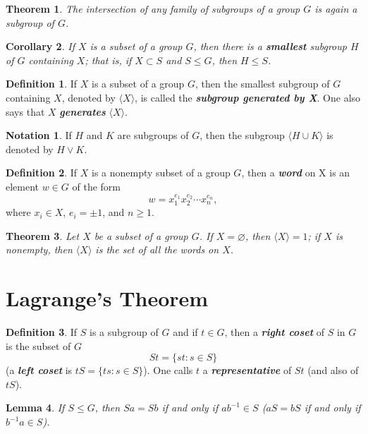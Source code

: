 \documentclass[12pt]{report}
\newtheorem{theorem}{Theorem}[chapter]
\newtheorem{corollary}[theorem]{Corollary}
\newtheorem{lemma}[theorem]{Lemma}
\theoremstyle{definition}
\newtheorem*{definition}{Definition}
\newtheorem*{notation}{Notation}
\newcommand{\term}[1]{\textbf{\textit{#1}}}
\newcommand{\gen}[1]{{\langle}#1{\rangle}}
\begin{document}
\begin{theorem}
	The intersection of any family of subgroups of a group $G$ is again a subgroup of $G$.
\end{theorem}

\begin{corollary}
	If $X$ is a subset of a group $G$, then there is a \textbf{smallest} subgroup $H$ of $G$ containing $X$; that is, if $X\subset S$ and $S\leq G$, then $H\leq S$.
\end{corollary}

\begin{definition}
	If $X$ is a subset of a group $G$, then the smallest subgroup of $G$ containing $X$, denoted by $\gen{X}$, is called the \term{subgroup generated by X}.
	One also says that $X$ \term{generates} $\gen{X}$.
\end{definition}

\begin{notation}
	If $H$ and $K$ are subgroups of $G$, then the subgroup $\gen{H\cup K}$ is denoted by $H\vee K$.
\end{notation}

\begin{definition}
	If $X$ is a nonempty subset of a group $G$, then a \term{word} on X is an element $w\in G$ of the form
	\[ w = x_1^{e_1} x_2^{e_2} \cdots x_n^{e_n}, \]
	where $x_i\in X$, $e_i=\pm1$, and $n\geq1$.
\end{definition}

\begin{theorem}
	Let $X$ be a subset of a group $G$. If $X=\varnothing$, then $\gen{X}=1$; if $X$ is nonempty, then $\gen{X}$ is the set of all the words on $X$.
\end{theorem}

\section{Lagrange's Theorem}
\begin{definition}
	If $S$ is a subgroup of $G$ and if $t\in G$, then a \term{right coset} of $S$ in $G$ is the subset of $G$
	\[ St = \{ st: s\in S \} \]
	(a \term{left coset} is $tS = \{ ts: s\in S \}$). One calls $t$ a \term{representative} of $St$ (and also of $tS$).
\end{definition}

\begin{lemma}
	If $S\leq G$, then $Sa=Sb$ if and only if $ab^{-1}\in S$ ($aS=bS$ if and only if $b^{-1}a\in S$).
\end{lemma}
\end{document}
